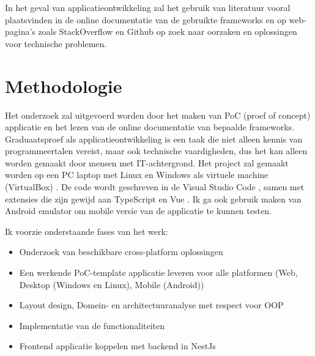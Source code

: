 In het geval van applicatieontwikkeling zal het gebruik van literatuur vooral plaatsvinden in de online documentatie van de gebruikte frameworks en op web-pagina's zoals StackOverflow \autocite{StackOverflow} en Github \autocite{Github} op zoek naar oorzaken en oplossingen voor technische problemen.



\section{Methodologie}%
\label{sec:methodologie}

Het onderzoek zal uitgevoerd worden door het maken van PoC (proef of concept) applicatie en het lezen van de online documentatie van bepaalde frameworks.
Graduaatsproef als applicatieontwikkeling is een taak die niet alleen kennis van programmeertalen vereist, maar ook technische vaardigheden, dus het kan alleen worden gemaakt door mensen met IT-achtergrond.
Het project zal gemaakt worden op een PC laptop met Linux en Windows als virtuele machine (VirtualBox) \autocite{VBox}. De code wordt geschreven in de Visual Studio Code \autocite{Vscode}, samen met extensies die zijn gewijd aan TypeScript en Vue \autocite{VueDoc}. Ik ga ook gebruik maken van Android emulator \autocite{AndroidDev} om mobile versie van de applicatie te kunnen testen.\newline


Ik voorzie onderstaande fases van het werk:
\begin{itemize}
  \item Onderzoek van beschikbare cross-platform oplossingen
  \item Een werkende PoC-template applicatie leveren voor alle platformen (Web, Desktop (Windows en Linux), Mobile (Android)) 
  \item Layout design, Domein- en architectuuranalyse met respect voor OOP \autocite{NyakundiOOP}
  \item Implementatie van de functionaliteiten
  \item Frontend applicatie koppelen met backend in NestJs \autocite{NestJsDoc}
\end{itemize}


